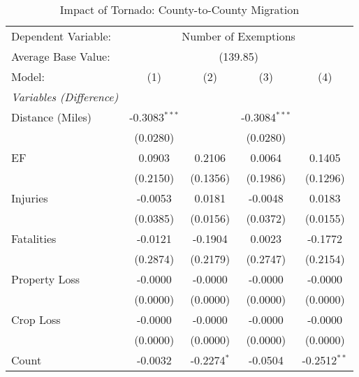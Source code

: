 \documentclass[letterpaper]{article}
\begin{document}

\begin{table}[H]
    \centering
    \caption{Impact of Tornado: County-to-County Migration}
    \label{t3}
    \small
\begin{tabular}{lcccc}
   \tabularnewline \midrule \midrule
   Dependent Variable: & \multicolumn{4}{c}{Number of Exemptions}\\

   Average Base Value: & \multicolumn{4}{c}{(139.85)}\\
   
   Model:           & (1)                     & (2)                     & (3)                     & (4)\\  
   \midrule
   \emph{Variables (Difference) }\\
   Distance (Miles)   & -0.3083$^{***}$         &                         & -0.3084$^{***}$         &   \\   
                    & (0.0280)                &                         & (0.0280)                &   \\   
   EF             & 0.0903                  & 0.2106                  & 0.0064                  & 0.1405\\   
                    & (0.2150)                & (0.1356)                & (0.1986)                & (0.1296)\\   
   Injuries             & -0.0053                 & 0.0181                  & -0.0048                 & 0.0183\\   
                    & (0.0385)                & (0.0156)                & (0.0372)                & (0.0155)\\   
   Fatalities              & -0.0121                 & -0.1904                 & 0.0023                  & -0.1772\\   
                    & (0.2874)                & (0.2179)                & (0.2747)                & (0.2154)\\   
   Property Loss            & -0.0000   & -0.0000    & -0.0000   & -0.0000\\    
                    & (0.0000)  & (0.0000)  & (0.0000)  & (0.0000)\\    
   Crop Loss           & -0.0000  & -0.0000   & -0.0000   & -0.0000\\    
                    & (0.0000)  & (0.0000)  & (0.0000)  & (0.0000)\\    
   Count          & -0.0032                 & -0.2274$^{*}$           & -0.0504                 & -0.2512$^{**}$\\   

\end{tabular}
\end{table}
\end{document}

